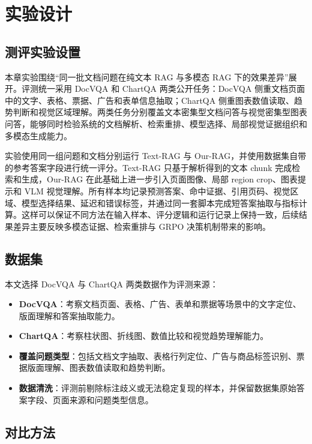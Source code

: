 \chapter{实验设计}

\section{测评实验设置}

本章实验围绕“同一批文档问题在纯文本 RAG 与多模态 RAG 下的效果差异”展开。评测统一采用 DocVQA 和 ChartQA 两类公开任务：DocVQA 侧重文档页面中的文字、表格、票据、广告和表单信息抽取；ChartQA 侧重图表数值读取、趋势判断和视觉区域理解。两类任务分别覆盖文本密集型文档问答与视觉密集型图表问答，能够同时检验系统的文档解析、检索重排、模型选择、局部视觉证据组织和多模态生成能力。

实验使用同一组问题和文档分别运行 Text-RAG 与 Our-RAG，并使用数据集自带的参考答案字段进行统一评分。Text-RAG 只基于解析得到的文本 chunk 完成检索和生成，Our-RAG 在此基础上进一步引入页面图像、局部 region crop、图表提示和 VLM 视觉理解。所有样本均记录预测答案、命中证据、引用页码、视觉区域、模型选择结果、延迟和错误标签，并通过同一套脚本完成短答案抽取与指标计算。这样可以保证不同方法在输入样本、评分逻辑和运行记录上保持一致，后续结果差异主要反映多模态证据、检索重排与 GRPO 决策机制带来的影响。

\section{数据集}

本文选择 DocVQA 与 ChartQA 两类数据作为评测来源：

\begin{itemize}
  \item \textbf{DocVQA}：考察文档页面、表格、广告、表单和票据等场景中的文字定位、版面理解和答案抽取能力。
  \item \textbf{ChartQA}：考察柱状图、折线图、数值比较和视觉趋势理解能力。
  \item \textbf{覆盖问题类型}：包括文档文字抽取、表格行列定位、广告与商品标签识别、票据版面理解、图表数值读取和趋势判断。
  \item \textbf{数据清洗}：评测前剔除标注歧义或无法稳定复现的样本，并保留数据集原始答案字段、页面来源和问题类型信息。
\end{itemize}

\section{对比方法}

